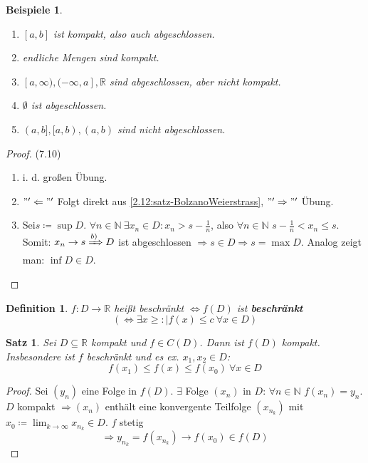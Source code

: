\documentclass[14pt,titlepage,ngerman,a4paper,headsepline,DIV15,halfparskip*]{scrartcl}
\newcommand{\N}{\mathbb{N}}
\newcommand{\R}{\mathbb{R}}
\theoremstyle{named}
\theoremstyle{dotless}
\newtheorem{satz}[namedtheorem]{Satz}
\newtheorem*{beispiele}{Beispiele}
\newtheorem*{definition}{Definition}
\begin{document}
\begin{beispiele} ~\
	\begin{enumerate}
		\item $[a, b]$ ist kompakt, also auch abgeschlossen.	
		\item endliche Mengen sind kompakt.
		\item $[a, \infty), (-\infty, a], \R$ sind abgeschlossen, aber nicht kompakt.
		\item $\emptyset$ ist abgeschlossen.
		\item $(a, b], [a, b), (a, b)$ sind nicht abgeschlossen.
	\end{enumerate}
\end{beispiele}


\begin{proof}(7.10) \\
	\begin{enumerate}
		\item i. d. gro{\ss}en Übung.
		\item $"'\Leftarrow"'$ Folgt direkt aus \ref{2.12:satz-BolzanoWeierstrass}, $"'\Rightarrow"'$ Übung.
		\item Sei$s \coloneqq \sup D$. $\forall n \in \N ~\exists x_{n} \in D: x_{n} > s - \frac{1}{n}$, also $\forall n \in \N$ $s - \frac{1}{n} < x_{n} \leq s$. Somit: $x_{n} \rightarrow s \xRightarrow[]{b)} D$ ist abgeschlossen $\Rightarrow s \in D \Rightarrow s = \max D$. Analog zeigt man: $\inf D \in D$.
	\end{enumerate}	
\end{proof}

\begin{definition}
	$f \colon D \rightarrow \R$ hei{\ss}t beschränkt $\iff f(D)$ ist \textbf{beschränkt} $$ (\iff \exists x \geq : |f(x) \leq c ~\forall x \in D) $$
\end{definition}


\begin{satz} \label{7.11:satz}
	Sei $D \subseteq \R$ kompakt und $f \in C(D)$. Dann ist $f(D)$ kompakt. Insbesondere ist $f$ beschränkt	und es ex. $x_{1}, x_{2} \in D$: 
		$$ f(x_{1}) \leq f(x) \leq f(x_{0}) ~\forall x \in D $$
\end{satz}

\begin{proof}
	Sei $(y_{n})$ eine Folge in $f(D)$. $\exists$ Folge $(x_{n})$ in $D$: $\forall n \in \N$ $f(x_{n}) = y_{n}$. $D$ kompakt $\Rightarrow (x_{n})$ enthält eine konvergente Teilfolge $(x_{n_{k}})$ mit $x_{0} \coloneqq \lim_{k \rightarrow \infty} x_{n_{k}} \in D$. $f$ stetig 
	$$ \Rightarrow y_{n_{k}} = f(x_{n_{k}}) \rightarrow f(x_{0}) \in f(D) $$
\end{proof}
\end{document}
